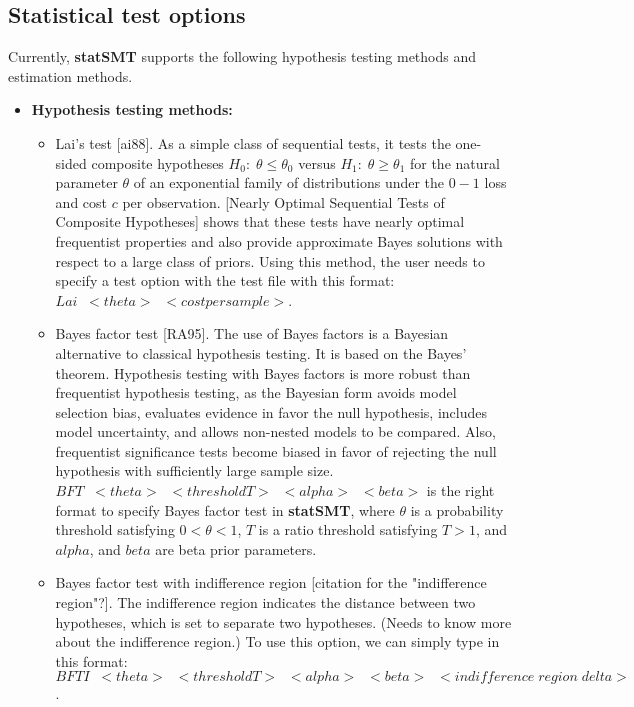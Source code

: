 \documentclass[runningheads,a4paper]{llncs}
\begin{document}
\subsection{Statistical test options}
Currently, {\bf statSMT} supports the following hypothesis testing methods and estimation methods.
\begin{itemize}
\item {\bf Hypothesis testing methods:}\\
\begin{itemize}
\item Lai's test [ai88]. As a simple class of sequential tests, it tests the one-sided composite hypotheses $H_0: \; \theta \leq \theta_0$ versus $H_1:\; \theta \geq \theta_1$ for the natural parameter $\theta$ of an exponential family of distributions under the $0-1$ loss and cost $c$ per observation. [Nearly Optimal Sequential Tests of Composite Hypotheses] shows that these tests have nearly optimal frequentist properties and also provide approximate Bayes solutions with respect to a large class of priors. Using this method, the user needs to specify a test option with the test file with this format: $Lai\;\; <theta>\;\; <cost per sample>$.\\
\item Bayes factor test [RA95]. The use of Bayes factors is a Bayesian alternative to classical hypothesis testing. It is based on the Bayes' theorem. Hypothesis testing with Bayes factors is more robust than frequentist hypothesis testing, as the Bayesian form avoids model selection bias, evaluates evidence in favor the null hypothesis, includes model uncertainty, and allows non-nested models to be compared. Also, frequentist significance tests become biased in favor of rejecting the null hypothesis with sufficiently large sample size. $BFT\;\; <theta>\;\; <threshold T> \;\;<alpha> \;\;<beta>$ is the right format to specify Bayes factor test in {\bf statSMT}, where $\theta$ is a probability threshold satisfying $0 < \theta < 1$, $T$ is a ratio threshold satisfying $T > 1$, and $alpha$, and $beta$ are beta prior parameters.\\
\item Bayes factor test with indifference region [citation for the "indifference region"?]. The indifference region indicates the distance between two hypotheses, which is set to separate two hypotheses. (Needs to know more about the indifference region.) To use this option, we can simply type in this format: \\
$BFTI \;\;<theta> \;\;<threshold T>\;\; <alpha> \;\;<beta> \;\;<indifference\; region\; delta>$.\\

\end{itemize}
\end{itemize}
\end{document}
